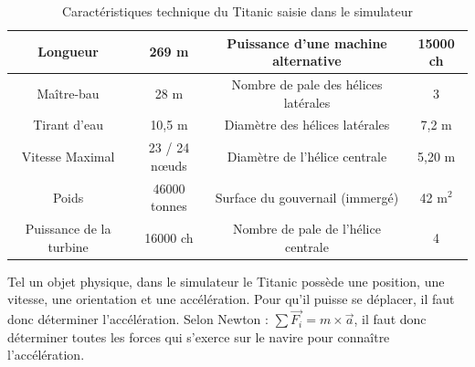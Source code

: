 \documentclass[a4paper,11pt]{article}
\begin{document}
    \begin{table}[H]
        \caption{Caractéristiques technique du Titanic saisie dans le simulateur}
        \label{tab:TitanicData}

        \begin{center}
            \begin{tabular}{|c|c||c|c|}
                \hline
                Longueur & 269 m & Puissance d'une machine alternative & 15000 ch \tabularnewline
                \hline
                Maître-bau & 28 m & Nombre de pale des hélices latérales & 3 \tabularnewline
                \hline
                Tirant d'eau & 10,5 m & Diamètre des hélices latérales & 7,2 m \tabularnewline
                \hline
                Vitesse Maximal & 23 / 24 nœuds & Diamètre de l'hélice centrale & 5,20 m \tabularnewline
                \hline
                Poids & 46000 tonnes & Surface du gouvernail (immergé) & 42 m$^{2}$ \tabularnewline
                \hline
                Puissance de la turbine & 16000 ch & Nombre de pale de l'hélice centrale & 4 \tabularnewline
                \hline
            \end{tabular}
        \end{center}
    \end{table}

    Tel un objet physique, dans le simulateur le Titanic possède une position, une vitesse, une orientation et une accélération. Pour qu'il puisse se déplacer, il faut donc déterminer l'accélération. Selon Newton : $\sum \overrightarrow{F_{i}} = m \times \overrightarrow{a}$, il faut donc déterminer toutes les forces qui s'exerce sur le navire pour connaître l’accélération.
\end{document}
